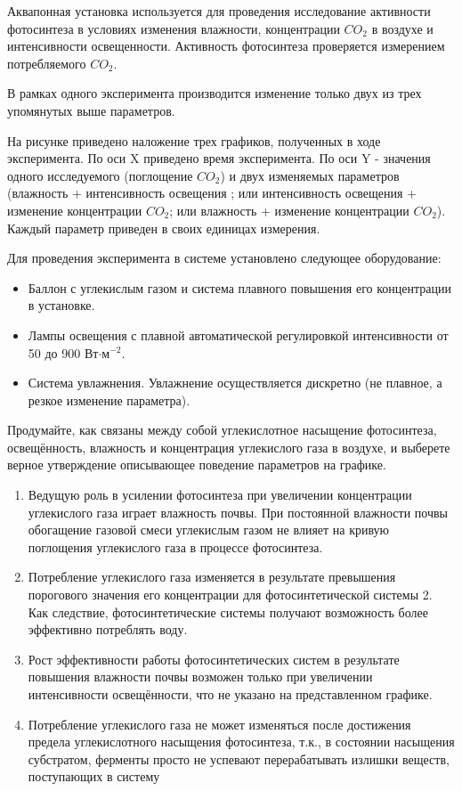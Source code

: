 
Аквапонная установка используется для проведения  исследование активности фотосинтеза в условиях 
изменения влажности, концентрации $CO_2$ в воздухе и интенсивности освещенности. Активность фотосинтеза проверяется измерением потребляемого $CO_2$.

В рамках одного эксперимента производится изменение только двух из трех упомянутых выше параметров.  

На рисунке приведено наложение трех графиков, полученных в ходе эксперимента. По оси X приведено время эксперимента. По оси Y - значения одного исследуемого (поглощение $CO_2$) и двух изменяемых параметров (влажность + интенсивность освещения ; или интенсивность освещения + изменение концентрации $CO_2$; или влажность + изменение концентрации $CO_2$). Каждый параметр приведен в своих единицах измерения.

Для проведения эксперимента в системе установлено следующее оборудование:

\begin{itemize}
    \item Баллон с углекислым газом и система плавного повышения его концентрации в установке.
    \item Лампы освещения с плавной автоматической регулировкой интенсивности от 50 до 900 Вт$\cdot$м$^{-2}$.
    \item Система увлажнения. Увлажнение осуществляется дискретно (не плавное, а резкое изменение параметра).
\end{itemize}

Продумайте, как связаны между собой углекислотное насыщение фотосинтеза, освещённость, влажность и концентрация углекислого газа в воздухе, и выберете верное утверждение описывающее поведение параметров на графике.


\begin{enumerate}
    \item Ведущую роль в усилении фотосинтеза при увеличении концентрации углекислого газа играет влажность почвы. При постоянной влажности почвы обогащение газовой смеси углекислым газом не влияет на кривую поглощения углекислого газа в процессе фотосинтеза.
    \item Потребление углекислого газа изменяется в результате превышения порогового значения его концентрации для фотосинтетической системы 2. Как следствие, фотосинтетические системы получают возможность более эффективно потреблять воду.
    \item Рост эффективности работы фотосинтетических систем в результате повышения влажности почвы возможен только при увеличении интенсивности освещённости, что не указано на представленном графике.
    \item Потребление углекислого газа не может изменяться после достижения предела углекислотного насыщения фотосинтеза, т.к., в состоянии насыщения субстратом, ферменты просто не успевают перерабатывать излишки веществ, поступающих в систему
\end{enumerate}

